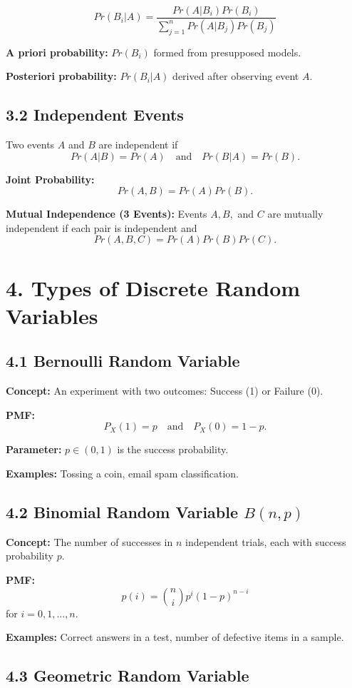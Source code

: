 \documentclass{article}
\begin{document}
\[
Pr(B_{i}|A)=\frac{Pr(A|B_{i})Pr(B_{i})}{\sum_{j=1}^{n}Pr(A|B_{j})Pr(B_{j})}
\]

\textbf{A priori probability:} $Pr(B_{i})$ formed from presupposed models.

\textbf{Posteriori probability:} $Pr(B_{i}|A)$ derived after observing event $A$.

\subsection*{3.2 Independent Events}

Two events $A$ and $B$ are independent if
\[
Pr(A|B)=Pr(A) \quad \text{and} \quad Pr(B|A)=Pr(B).
\]

\textbf{Joint Probability:}
\[
Pr(A,B)=Pr(A)Pr(B).
\]

\textbf{Mutual Independence (3 Events):}
Events $A, B,$ and $C$ are mutually independent if each pair is independent and
\[
Pr(A,B,C)=Pr(A)Pr(B)Pr(C).
\]

\section*{4. Types of Discrete Random Variables}

\subsection*{4.1 Bernoulli Random Variable}

\textbf{Concept:} An experiment with two outcomes: Success (1) or Failure (0).

\textbf{PMF:}
\[
P_{X}(1)=p \quad \text{and} \quad P_{X}(0)=1-p.
\]

\textbf{Parameter:} $p \in (0,1)$ is the success probability.

\textbf{Examples:} Tossing a coin, email spam classification.

\subsection*{4.2 Binomial Random Variable $B(n,p)$}

\textbf{Concept:} The number of successes in $n$ independent trials, each with success probability $p$.

\textbf{PMF:}
\[
p(i)=\binom{n}{i}p^{i}(1-p)^{n-i}
\]
for $i=0,1,...,n$.

\textbf{Examples:} Correct answers in a test, number of defective items in a sample.

\subsection*{4.3 Geometric Random Variable}
\end{document}
